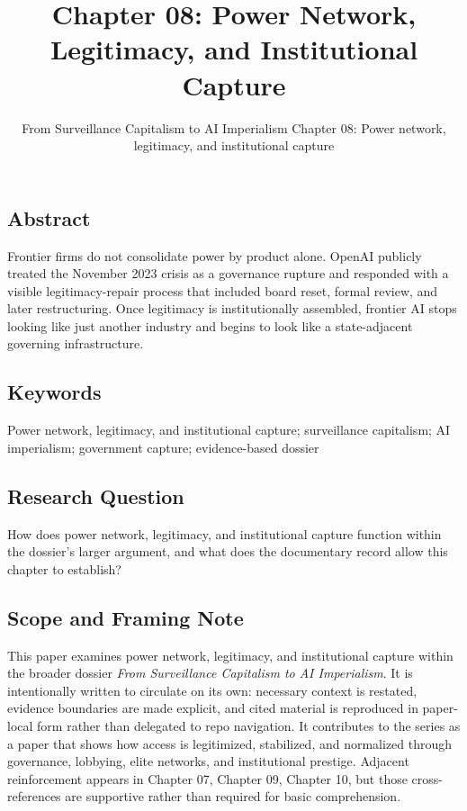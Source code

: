 \documentclass[
  american,
  11pt,
  letterpaper,
]{article}
\title{Chapter 08: Power Network, Legitimacy, and Institutional Capture}
\subtitle{From Surveillance Capitalism to AI Imperialism \textbar{}
Chapter 08: Power network, legitimacy, and institutional capture}
\author{}
\date{}
\begin{document}
\maketitle

\subsection{Abstract}\label{abstract}

Frontier firms do not consolidate power by product alone. OpenAI
publicly treated the November 2023 crisis as a governance rupture and
responded with a visible legitimacy-repair process that included board
reset, formal review, and later restructuring. Once legitimacy is
institutionally assembled, frontier AI stops looking like just another
industry and begins to look like a state-adjacent governing
infrastructure.

\subsection{Keywords}\label{keywords}

Power network, legitimacy, and institutional capture; surveillance
capitalism; AI imperialism; government capture; evidence-based dossier

\subsection{Research Question}\label{research-question}

How does power network, legitimacy, and institutional capture function
within the dossier's larger argument, and what does the documentary
record allow this chapter to establish?

\subsection{Scope and Framing Note}\label{scope-and-framing-note}

This paper examines power network, legitimacy, and institutional capture
within the broader dossier \emph{From Surveillance Capitalism to AI
Imperialism}. It is intentionally written to circulate on its own:
necessary context is restated, evidence boundaries are made explicit,
and cited material is reproduced in paper-local form rather than
delegated to repo navigation. It contributes to the series as a paper
that shows how access is legitimized, stabilized, and normalized through
governance, lobbying, elite networks, and institutional prestige.
Adjacent reinforcement appears in Chapter 07, Chapter 09, Chapter 10,
but those cross-references are supportive rather than required for basic
comprehension.
\end{document}
